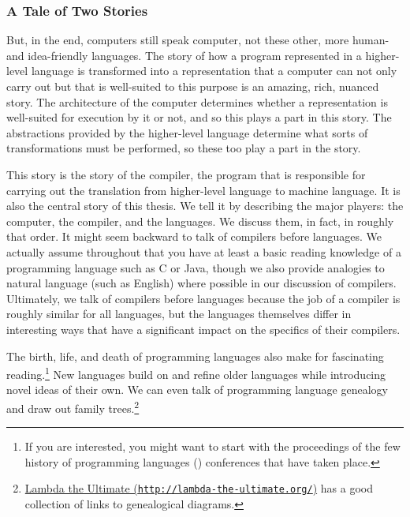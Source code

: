 \subsubsection*{A Tale of Two Stories}
But, in the end, computers still speak computer, not these other, more human- and idea-friendly languages. The story of how a program represented in a higher-level language is transformed into a representation that a computer can not only carry out but that is well-suited to this purpose is an amazing, rich, nuanced story. The architecture of the computer determines whether a representation is well-suited for execution by it or not, and so this plays a part in this story. The abstractions provided by the higher-level language determine what sorts of transformations must be performed, so these too play a part in the story.

This story is the story of the compiler, the program that is responsible for carrying out the translation from higher-level language to machine language. It is also the central story of this thesis. We tell it by describing the major players: the computer, the compiler, and the languages. We discuss them, in fact, in roughly that order. It might seem backward to talk of compilers before languages. We actually assume throughout that you have at least a basic reading knowledge of a programming language such as C or Java, though we also provide analogies to natural language (such as English) where possible in our discussion of compilers. Ultimately, we talk of compilers before languages because the job of a compiler is roughly similar for all languages, but the languages themselves differ in interesting ways that have a significant impact on the specifics of their compilers.

The birth, life, and death of programming languages also make for fascinating reading.\footnote{If you are interested, you might want to start with the proceedings of the few history of programming languages () conferences that have taken place.} New languages build on and refine older languages while introducing novel ideas of their own. We can even talk of programming language genealogy and draw out family trees.\footnote{\href{http://lambda-the-ultimate.org/}{Lambda the Ultimate (\nolinkurl{http://lambda-the-ultimate.org/})} has a good collection of links to genealogical diagrams.}

